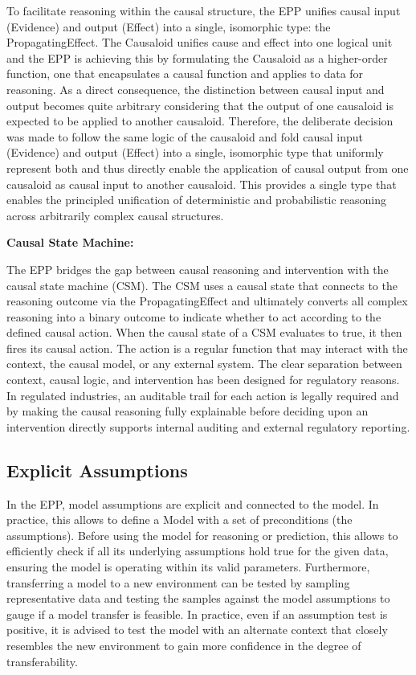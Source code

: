 To facilitate reasoning within the causal structure, the EPP unifies causal input (Evidence) and output (Effect) into a single, isomorphic type: the PropagatingEffect. The Causaloid unifies cause and effect into one logical unit and the EPP is achieving this by formulating the Causaloid as a higher-order function, one that encapsulates a causal function and applies to data for reasoning. As a direct consequence, the distinction between causal input and output becomes quite arbitrary considering that the output of one causaloid is expected to be applied to another causaloid. Therefore, the deliberate decision was made to follow the same logic of the causaloid and fold causal input (Evidence) and output (Effect) into a single, isomorphic type that uniformly represent both and thus directly enable the application of causal output from one causaloid as causal input to another causaloid. This provides a single type that enables the principled unification of deterministic and probabilistic reasoning across arbitrarily complex causal structures. 
 

\textbf{Causal State Machine:}

The EPP bridges the gap between causal reasoning and intervention with the causal state machine (CSM). The CSM uses a causal state that connects to the reasoning outcome via the  PropagatingEffect and ultimately converts all complex reasoning into a binary outcome to indicate whether to act according to the defined causal action. When the causal state of a CSM evaluates to true, it then fires its causal action. The action is a regular function that may interact with the context, the causal model, or any external system. The clear separation between context, causal logic, and intervention has been designed for regulatory reasons. In regulated industries, an auditable trail for each action is legally required  and by making the causal reasoning fully explainable before deciding upon an intervention directly supports internal auditing and external regulatory reporting.   

%
%
\subsection{Explicit Assumptions}
\label{sec:assumptions}
 
 In the EPP, model assumptions are explicit and connected to the model.  In practice, this allows to define a Model with a set of preconditions (the
  assumptions). Before using the model for reasoning or prediction, this allows to efficiently check if all its underlying
  assumptions hold true for the given data, ensuring the model is operating within its  valid parameters. Furthermore, transferring a model to a new environment can be
  tested by sampling representative data and testing the samples against the model assumptions to gauge if a model transfer is feasible. In practice, even if an assumption test is positive, it is advised to test the model with an alternate context that closely resembles the new environment to gain more confidence in the degree of transferability. 
 
